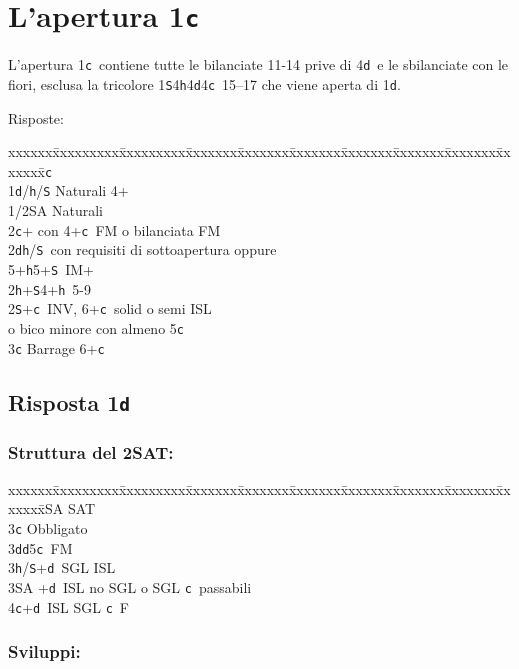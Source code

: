 \documentclass[a4paper,italian]{article}
\newcommand{\BS}{\small{\texttt{S}}}
\newcommand{\BC}{\small{\texttt{c}}}
\newcommand{\BD}{\small{\texttt{d}}}
\newcommand{\BH}{\small{\texttt{h}}}
\newcommand{\pdfc}{\texorpdfstring{\texttt{c}}{C}}
\newcommand{\pdfd}{\texorpdfstring{\texttt{d}}{D}}
\newenvironment{bidtable}
{\begin{tabbing}

    xxxxxx\=xxxxxxxxx\=xxxxxxxxx\=xxxxxxx\=xxxxxxx\=xxxxxxx\=xxxxxxx\=xxxxxxx\=xxxxxxx\=xxxxxxx\=\kill}
{\end{tabbing} }%
\begin{document}
\section{L'apertura 1\pdfc}

\begin{multicols}{2}
    L'apertura 1\BC\ contiene tutte le bilanciate 11-14 prive di 4\BD\ e le sbilanciate con le fiori, esclusa la tricolore 1\BS 4\BH 4\BD 4\BC\ 15--17
    che viene aperta di 1\BD .

    Risposte:
    \begin{bidtable}
        1\BC\+\\
        1\BD/\BH/\BS \>\hspace{5pt} Naturali 4+\\
        1/2\small{SA} \> Naturali\\
        2\BC {}+ con 4+\BC\ FM o bilanciata FM\\
        2\BD {}\BH /\BS\ con requisiti di sottoapertura oppure\+\\ 5+\BH 5+\BS\ IM+\-\\
        2\BH {}+\BS 4+\BH\ 5-9\\
        2\BS {}+\BC\ INV, 6+\BC\ solid o semi ISL \+\\ o bico minore con almeno 5\BC\-\\
        3\BC \> Barrage 6+\BC \-
    \end{bidtable}

    \subsection{Risposta 1\pdfd}

    \subsubsection{Struttura del 2SAT:}

    \begin{bidtable}
        2\small{SA} \small{SA}T\+\\
        3\BC \> Obbligato\+\\
        3\BD {}\BD 5\BC\ FM\\
        3\BH/\BS {}+\BD\ SGL ISL\\
        3\small{SA} +\BD\ ISL no SGL o SGL \BC\ passabili\\
        4\BC {}+\BD\ ISL SGL \BC\ F\-\-
    \end{bidtable}

    \subsubsection{Sviluppi:}


\end{multicols}
\end{document}
